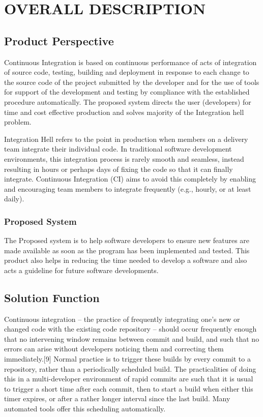 \documentclass[12pt,a4paper,oneside]{report}
\begin{document}
\chapter{OVERALL DESCRIPTION}
\section{Product Perspective}
\par
Continuous Integration is based on continuous performance of acts of integration of
source code, testing, building and deployment in response to each change to the source code of
the project submitted by the developer and for the use of tools for support of the development
and testing by compliance with the established procedure automatically. The proposed system
directs the user (developers) for time and cost effective production and solves majority of the
Integration hell problem. \par
Integration Hell refers to the point in production when members on a delivery team integrate
their individual code. In traditional software development environments, this integration
process is rarely smooth and seamless, instead resulting in hours or perhaps days of fixing the
code so that it can finally integrate. Continuous Integration (CI) aims to avoid this completely
by enabling and encouraging team members to integrate frequently (e.g., hourly, or at least
daily).

\subsection{Proposed System}
\par 
The Proposed system is to help software developers to ensure new features are made
available as soon as the program has been implemented and tested. This product also helps in
reducing the time needed to develop a software and also acts a guideline for future software
developments.
\section{Solution Function}

\par Continuous integration – the practice of frequently integrating one's new or changed code with the existing code repository – should occur frequently enough that no intervening window remains between commit and build, and such that no errors can arise without developers noticing them and correcting them immediately.[9] Normal practice is to trigger these builds by every commit to a repository, rather than a periodically scheduled build. The practicalities of doing this in a multi-developer environment of rapid commits are such that it is usual to trigger a short time after each commit, then to start a build when either this timer expires, or after a rather longer interval since the last build. Many automated tools offer this scheduling automatically.
\end{document}
